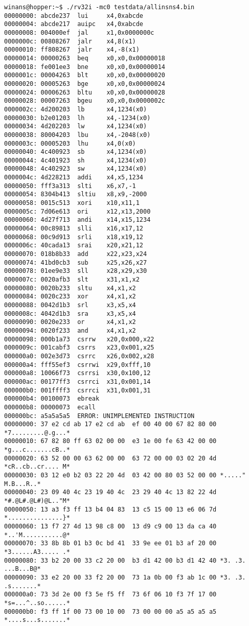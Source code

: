 \documentclass[11pt]{article}
\begin{document}
{\footnotesize
\begin{verbatim}
winans@hopper:~$ ./rv32i -mc0 testdata/allinsns4.bin
00000000: abcde237  lui     x4,0xabcde
00000004: abcde217  auipc   x4,0xabcde
00000008: 004000ef  jal     x1,0x0000000c
0000000c: 00808267  jalr    x4,8(x1)
00000010: ff808267  jalr    x4,-8(x1)
00000014: 00000263  beq     x0,x0,0x00000018
00000018: fe001ee3  bne     x0,x0,0x00000014
0000001c: 00004263  blt     x0,x0,0x00000020
00000020: 00005263  bge     x0,x0,0x00000024
00000024: 00006263  bltu    x0,x0,0x00000028
00000028: 00007263  bgeu    x0,x0,0x0000002c
0000002c: 4d200203  lb      x4,1234(x0)
00000030: b2e01203  lh      x4,-1234(x0)
00000034: 4d202203  lw      x4,1234(x0)
00000038: 80004203  lbu     x4,-2048(x0)
0000003c: 00005203  lhu     x4,0(x0)
00000040: 4c400923  sb      x4,1234(x0)
00000044: 4c401923  sh      x4,1234(x0)
00000048: 4c402923  sw      x4,1234(x0)
0000004c: 4d228213  addi    x4,x5,1234
00000050: fff3a313  slti    x6,x7,-1
00000054: 8304b413  sltiu   x8,x9,-2000
00000058: 0015c513  xori    x10,x11,1
0000005c: 7d06e613  ori     x12,x13,2000
00000060: 4d27f713  andi    x14,x15,1234
00000064: 00c89813  slli    x16,x17,12
00000068: 00c9d913  srli    x18,x19,12
0000006c: 40cada13  srai    x20,x21,12
00000070: 018b8b33  add     x22,x23,x24
00000074: 41bd0cb3  sub     x25,x26,x27
00000078: 01ee9e33  sll     x28,x29,x30
0000007c: 0020afb3  slt     x31,x1,x2
00000080: 0020b233  sltu    x4,x1,x2
00000084: 0020c233  xor     x4,x1,x2
00000088: 0042d1b3  srl     x3,x5,x4
0000008c: 4042d1b3  sra     x3,x5,x4
00000090: 0020e233  or      x4,x1,x2
00000094: 0020f233  and     x4,x1,x2
00000098: 000b1a73  csrrw   x20,0x000,x22
0000009c: 001cabf3  csrrs   x23,0x001,x25
000000a0: 002e3d73  csrrc   x26,0x002,x28
000000a4: fff55ef3  csrrwi  x29,0xfff,10
000000a8: 10066f73  csrrsi  x30,0x100,12
000000ac: 00177ff3  csrrci  x31,0x001,14
000000b0: 001ffff3  csrrci  x31,0x001,31
000000b4: 00100073  ebreak
000000b8: 00000073  ecall
000000bc: a5a5a5a5  ERROR: UNIMPLEMENTED INSTRUCTION
00000000: 37 e2 cd ab 17 e2 cd ab  ef 00 40 00 67 82 80 00 *7.........@.g...*
00000010: 67 82 80 ff 63 02 00 00  e3 1e 00 fe 63 42 00 00 *g...c.......cB..*
00000020: 63 52 00 00 63 62 00 00  63 72 00 00 03 02 20 4d *cR..cb..cr.... M*
00000030: 03 12 e0 b2 03 22 20 4d  03 42 00 80 03 52 00 00 *....." M.B...R..*
00000040: 23 09 40 4c 23 19 40 4c  23 29 40 4c 13 82 22 4d *#.@L#.@L#)@L.."M*
00000050: 13 a3 f3 ff 13 b4 04 83  13 c5 15 00 13 e6 06 7d *...............}*
00000060: 13 f7 27 4d 13 98 c8 00  13 d9 c9 00 13 da ca 40 *..'M...........@*
00000070: 33 8b 8b 01 b3 0c bd 41  33 9e ee 01 b3 af 20 00 *3......A3..... .*
00000080: 33 b2 20 00 33 c2 20 00  b3 d1 42 00 b3 d1 42 40 *3. .3. ...B...B@*
00000090: 33 e2 20 00 33 f2 20 00  73 1a 0b 00 f3 ab 1c 00 *3. .3. .s.......*
000000a0: 73 3d 2e 00 f3 5e f5 ff  73 6f 06 10 f3 7f 17 00 *s=...^..so......*
000000b0: f3 ff 1f 00 73 00 10 00  73 00 00 00 a5 a5 a5 a5 *....s...s.......*
\end{verbatim}
}
\end{document}
